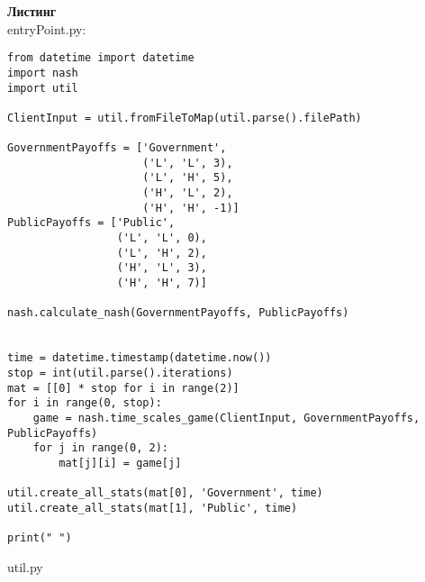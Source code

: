 \textbf{Листинг}\\
 entryPoint.py:
  \begin{lstlisting}[style=fsharpstyle]
 from datetime import datetime
import nash
import util

ClientInput = util.fromFileToMap(util.parse().filePath)

GovernmentPayoffs = ['Government',
                     ('L', 'L', 3),
                     ('L', 'H', 5),
                     ('H', 'L', 2),
                     ('H', 'H', -1)]
PublicPayoffs = ['Public',
                 ('L', 'L', 0),
                 ('L', 'H', 2),
                 ('H', 'L', 3),
                 ('H', 'H', 7)]

nash.calculate_nash(GovernmentPayoffs, PublicPayoffs)


time = datetime.timestamp(datetime.now())
stop = int(util.parse().iterations)
mat = [[0] * stop for i in range(2)]
for i in range(0, stop):
    game = nash.time_scales_game(ClientInput, GovernmentPayoffs, PublicPayoffs)
    for j in range(0, 2):
        mat[j][i] = game[j]

util.create_all_stats(mat[0], 'Government', time)
util.create_all_stats(mat[1], 'Public', time)

print(" ")

  \end{lstlisting}
  util.py
